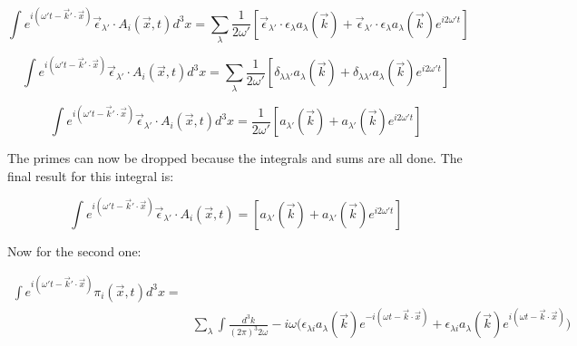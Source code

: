 \documentclass[a4]{article}
\begin{document}
    \begin{equation}
        \int e^{i (\omega' t - \vec{k}' \cdot \vec{x})} \vec{\epsilon}_{\lambda'} \cdot A_{i} (\vec{x}, t) d^3 x = \sum_{\lambda} \frac{1}{2 \omega'} [\vec{\epsilon}_{\lambda'} \cdot \epsilon_{\lambda} a_{\lambda} (\vec{k}) + \vec{\epsilon}_{\lambda'} \cdot \epsilon_{\lambda} a_{\lambda} (\vec{k}) e^{i2 \omega' t}]
    \end{equation}

    \begin{equation}
        \int e^{i (\omega' t - \vec{k}' \cdot \vec{x})} \vec{\epsilon}_{\lambda'} \cdot A_{i} (\vec{x}, t) d^3 x = \sum_{\lambda} \frac{1}{2 \omega'} [\delta_{\lambda \lambda'} a_{\lambda} (\vec{k}) + \delta_{\lambda \lambda'} a_{\lambda} (\vec{k}) e^{i2 \omega' t}]
    \end{equation}

    \begin{equation}
        \int e^{i (\omega' t - \vec{k}' \cdot \vec{x})} \vec{\epsilon}_{\lambda'} \cdot A_{i} (\vec{x}, t) d^3 x = \frac{1}{2 \omega'} [a_{\lambda'} (\vec{k}) + a_{\lambda'} (\vec{k}) e^{i2 \omega' t}]
    \end{equation}
    
    The primes can now be dropped because the integrals and sums are all done. The final result for this integral is:

    \begin{framed}
        \begin{equation}
            \int e^{i (\omega' t - \vec{k}' \cdot \vec{x})} \vec{\epsilon}_{\lambda'} \cdot A_{i} (\vec{x}, t) = [a_{\lambda'} (\vec{k}) + a_{\lambda'} (\vec{k}) e^{i2 \omega' t}]
        \end{equation}
    \end{framed}

    Now for the second one:

    \begin{equation} %
        \begin{aligned}
            \int e^{i (\omega' t - \vec{k}' \cdot \vec{x})} \pi_{i} (\vec{x}, t) d^{3} x = & \\
            & \sum_{\lambda} \int \frac{d^{3} k}{(2 \pi)^{3} 2 \omega} - i \omega \bigg( \epsilon_{\lambda i} a_{\lambda} (\vec{k}) e^{- i (\omega t - \vec{k} \cdot \vec{x})} + \epsilon_{\lambda i} a_{\lambda} (\vec{k}) e^{i (\omega t - \vec{k} \cdot \vec{x})} \bigg)
        \end{aligned}
    \end{equation}
\end{document}
